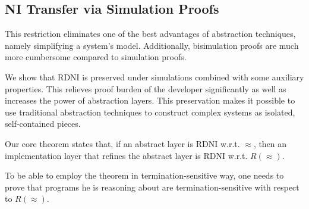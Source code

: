 \subsection{NI Transfer via Simulation Proofs}
This restriction eliminates one of the best advantages of abstraction techniques, namely simplifying a system's model. Additionally, bisimulation proofs are much more cumbersome compared to simulation proofs. 

We show that RDNI is preserved under simulations combined with some auxiliary properties. This relieves proof burden of the developer significantly as well as increases the power of abstraction layers. This preservation makes it possible to use traditional abstraction techniques to construct complex systems as isolated, self-contained pieces.

Our core theorem states that, if an abstract layer is RDNI w.r.t. $\approx$, then an implementation layer that refines the abstract layer is RDNI w.r.t. $R(\approx)$.  

To be able to employ the theorem in termination-sensitive way, one needs to prove that programs he is reasoning about are termination-sensitive with respect to $R(\approx)$.